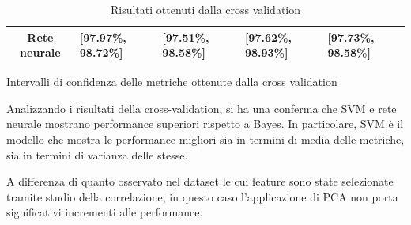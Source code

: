 \begin{table}[!ht]
\begin{subtable}[h]{1\textwidth}
\begin{tabular}{@{}cllll@{}}
            \cellcolor[HTML]{EFEFEF}\textbf{Rete neurale}         & [97.97\%, 98.72\%]   & [97.51\%, 98.58\%]  & [97.62\%, 98.93\%] & [97.73\%, 98.58\%] \\ \bottomrule
        \end{tabular}
        \caption{Intervalli di confidenza delle metriche ottenute dalla cross validation}
        \label{tab:intervalli_confidenza_pca}
    \end{subtable}
    \caption{Risultati ottenuti dalla cross validation}
    \label{tab:media_intervalli_confidenza_pca}
\end{table}

Analizzando i risultati della cross-validation, si ha una conferma che SVM e
rete neurale mostrano performance superiori rispetto a Bayes. In particolare,
SVM è il modello che mostra le performance migliori sia in termini di media delle
metriche, sia in termini di varianza delle stesse.

A differenza di quanto osservato nel dataset le cui feature sono state selezionate
tramite studio della correlazione, in questo caso l'applicazione di PCA non
porta significativi incrementi alle performance.

